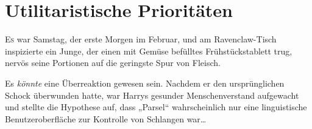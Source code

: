 \chapter{Utilitaristische Prioritäten}

\lettrine{E}{s} war Samstag, der erste Morgen im Februar, und am Ravenclaw-Tisch inspizierte ein Junge, der einen mit Gemüse befülltes Frühstückstablett trug, nervös seine Portionen auf die geringste Spur von Fleisch.

Es \emph{könnte} eine Überreaktion gewesen sein. Nachdem er den ursprünglichen Schock überwunden hatte, war Harrys gesunder Menschenverstand aufgewacht und stellte die Hypothese auf, dass „Parsel“ wahrscheinlich nur eine linguistische Benutzeroberfläche zur Kontrolle von Schlangen war…

